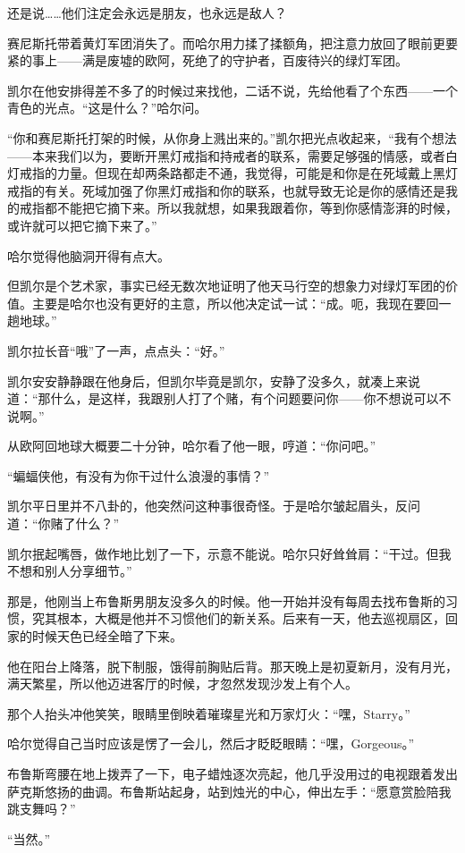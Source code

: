 \documentclass[../main]{subfiles}
\begin{document}
还是说……他们注定会永远是朋友，也永远是敌人？

赛尼斯托带着黄灯军团消失了。而哈尔用力揉了揉额角，把注意力放回了眼前更要紧的事上——满是废墟的欧阿，死绝了的守护者，百废待兴的绿灯军团。

凯尔在他安排得差不多了的时候过来找他，二话不说，先给他看了个东西——一个青色的光点。“这是什么？”哈尔问。

“你和赛尼斯托打架的时候，从你身上溅出来的。”凯尔把光点收起来，“我有个想法——本来我们以为，要断开黑灯戒指和持戒者的联系，需要足够强的情感，或者白灯戒指的力量。但现在却两条路都走不通，我觉得，可能是和你是在死域戴上黑灯戒指的有关。死域加强了你黑灯戒指和你的联系，也就导致无论是你的感情还是我的戒指都不能把它摘下来。所以我就想，如果我跟着你，等到你感情澎湃的时候，或许就可以把它摘下来了。”

哈尔觉得他脑洞开得有点大。

但凯尔是个艺术家，事实已经无数次地证明了他天马行空的想象力对绿灯军团的价值。主要是哈尔也没有更好的主意，所以他决定试一试：“成。呃，我现在要回一趟地球。”

凯尔拉长音“哦”了一声，点点头：“好。”

凯尔安安静静跟在他身后，但凯尔毕竟是凯尔，安静了没多久，就凑上来说道：“那什么，是这样，我跟别人打了个赌，有个问题要问你——你不想说可以不说啊。”

从欧阿回地球大概要二十分钟，哈尔看了他一眼，哼道：“你问吧。”

“蝙蝠侠他，有没有为你干过什么浪漫的事情？”

凯尔平日里并不八卦的，他突然问这种事很奇怪。于是哈尔皱起眉头，反问道：“你赌了什么？”

凯尔抿起嘴唇，做作地比划了一下，示意不能说。哈尔只好耸耸肩：“干过。但我不想和别人分享细节。”

那是，他刚当上布鲁斯男朋友没多久的时候。他一开始并没有每周去找布鲁斯的习惯，究其根本，大概是他并不习惯他们的新关系。后来有一天，他去巡视扇区，回家的时候天色已经全暗了下来。

他在阳台上降落，脱下制服，饿得前胸贴后背。那天晚上是初夏新月，没有月光，满天繁星，所以他迈进客厅的时候，才忽然发现沙发上有个人。

那个人抬头冲他笑笑，眼睛里倒映着璀璨星光和万家灯火：“嘿，Starry。”

哈尔觉得自己当时应该是愣了一会儿，然后才眨眨眼睛：“嘿，Gorgeous。”

布鲁斯弯腰在地上拨弄了一下，电子蜡烛逐次亮起，他几乎没用过的电视跟着发出萨克斯悠扬的曲调。布鲁斯站起身，站到烛光的中心，伸出左手：“愿意赏脸陪我跳支舞吗？”

“当然。”
\end{document}
